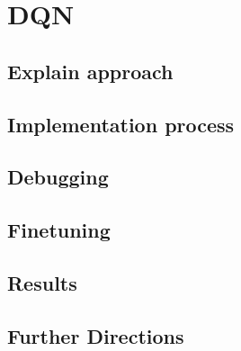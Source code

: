 \section{DQN}

\subsection{Explain approach}

\subsection{Implementation process}

\subsection{Debugging}

\subsection{Finetuning}

\subsection{Results}

\subsection{Further Directions}

